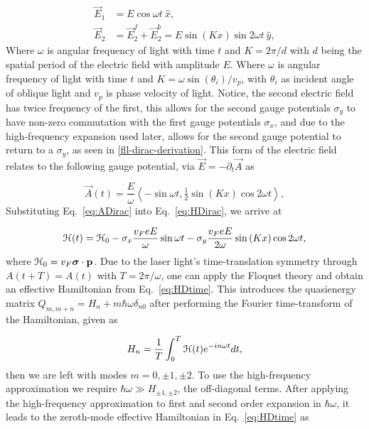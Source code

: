 \begin{align} \label{eq:EDfield}
\vec{E}_{1} &= E\cos \omega t\ \hat{x}, \nonumber \\
\vec{E}_{2} &= \vec{E}_2^f + \vec{E}_2^b = E\sin(Kx)\sin 2\omega t\ \hat{y},
\end{align}
Where $\omega$ is angular frequency of light with time $t$ and $K=2\pi /d$ with $d$ being the spatial period of the electric field with amplitude $E$.
Where $\omega$ is angular frequency of light with time $t$ and $K = \omega \sin{(\theta_i)} / v_p$, with $\theta_i$ as incident angle of oblique light and $v_p$ is phase velocity of light.
Notice, the second electric field has twice frequency of the first, this allows for the second gauge potentials $\sigma_y$ to have non-zero commutation with the first gauge potentials $\sigma_x$, and due to the high-frequency expansion used later, allows for the second gauge potential to return to a $\sigma_y$, as seen in \ref{fll-dirac-derivation}.
This form of the electric field relates to the following gauge potential, via $\vec{E} = -\partial_t \vec{A}$ as

\begin{equation}\label{eq:ADirac}
  \vec{A}(t)= \dfrac{E}{\omega} \left\langle -\sin \omega t, \tfrac{1}{2}\sin(Kx) \cos 2\omega t \right\rangle,
\end{equation}%
Substituting Eq.~\eqref{eq:ADirac} into Eq.~\eqref{eq:HDirac}, we arrive at%

\begin{equation}\label{eq:HDtime}
  \mathcal{H}(t)=\mathcal{H}_{0} - \sigma _{x} \dfrac{v_F eE}{\omega} \sin {\omega t} - \sigma _{y} \dfrac{v_F eE}{2\omega}\sin{(Kx)} \cos2\omega t,
\end{equation}%
where $\mathcal{H}_0 = v_{F}\bm{\sigma}\cdot\mathbf{p}$.
Due to the laser light's time-translation symmetry through $A(t+T)=A(t)$ with $T=2\pi /\omega $, one can apply the Floquet theory \cite{AEE, MBL, supp} and obtain an effective Hamiltonian from Eq.~\eqref{eq:HDtime}.
This introduces the quasienergy matrix $Q_{m,m+n} = H_n + m\hbar\omega\delta_{n0}$ after performing the Fourier time-transform of the Hamiltonian, given as

\begin{equation} \label{eq:fourier-time-transform}
  H_n = \dfrac{1}{T} \int_{0}^{T} \mathcal{H}(t) e^{-in\omega t} dt,
\end{equation}
then we are left with modes $m=0,\pm1,\pm2$.
To use the high-frequency approximation we require $\hbar\omega \gg H_{\pm1,\pm2}$, the off-diagonal terms.
After applying the high-frequency approximation to first and second order expansion in $\hbar\omega$, it leads to the zeroth-mode effective Hamiltonian in Eq.~\eqref{eq:HDtime} as

